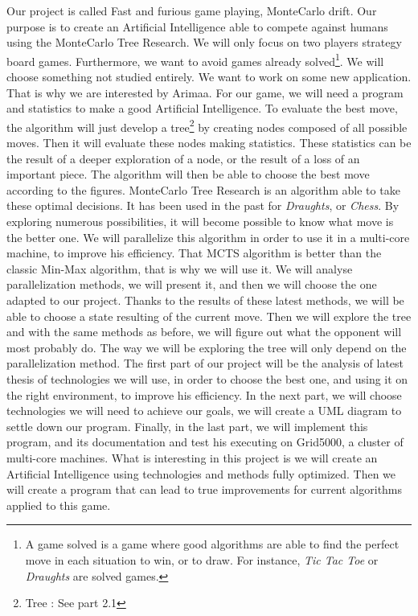 
Our project is called Fast and furious game playing, MonteCarlo drift. Our purpose is to create an Artificial Intelligence able to compete against humans using the MonteCarlo Tree Research.
\newline
We will only focus on two players strategy board games. Furthermore, we want to avoid games already solved\footnote{A game solved is a game where good algorithms are able to find the perfect move in each situation to win, or to draw. For instance, \textit{Tic Tac Toe} or \textit{Draughts} are solved games.}. We will choose something not studied entirely. We want to work on some new application. That is why we are interested by Arimaa.
\newline
\newline
For our game, we will need a program and statistics to make a good Artificial Intelligence. To evaluate the best move, the algorithm will just develop a tree\footnote{Tree : See part 2.1} by creating nodes composed of all possible moves. Then it will evaluate these nodes making statistics. These statistics can be the result of a deeper exploration of a node, or the result of a loss of an important piece. The algorithm will then be able to choose the best move according to the figures.
MonteCarlo Tree Research is an algorithm able to take these optimal decisions. It has been used in the past for \textit{Draughts}, or \textit{Chess}. By exploring numerous possibilities, it will become possible to know what move is the better one.
We will parallelize this algorithm in order to use it in a multi-core machine, to improve his efficiency.
That MCTS algorithm is better than the classic Min-Max algorithm, that is why we will use it.
\newline
\newline
We will analyse parallelization methods, we will present it, and then we will choose the one adapted to our project.
Thanks to the results of these latest methods, we will be able to choose a state resulting of the current move. Then we will explore the tree and with the same methods as before, we will figure out what the opponent will most probably do. The way we will be exploring the tree will only depend on the parallelization method.
The first part of our project will be the analysis of latest thesis of technologies we will use, in order to choose the best one, and using it on the right environment, to improve his  efficiency.
In the next part, we will choose technologies we will need to achieve our goals, we will create a UML diagram to settle down our program.
\newline
\newline
Finally, in the last part, we will implement this program, and its documentation and test his executing on Grid5000, a cluster of multi-core machines.
What is interesting in this project is we will create an Artificial Intelligence using technologies and methods fully optimized. Then we will create a program that can lead to true improvements for current algorithms applied to this game.


